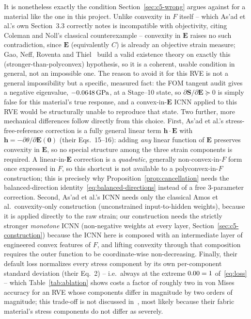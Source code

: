 \documentclass[10pt,a4paper]{article}
\begin{document}
It is nonetheless exactly the condition Section~\ref{sec:c5-wrong} argues
against for a material like the one in this project. Unlike convexity in
$F$ itself -- which As'ad et al.'s own Section~3.3 correctly notes is
incompatible with objectivity, citing Coleman and Noll's classical
counterexample -- convexity in $\bm E$ raises no such contradiction,
since $\bm E$ (equivalently $C$) is already an objective strain measure;
Gao, Neff, Roventa and Thiel~\cite{GaoNeffRoventaThiel2017} build a valid
existence theory on exactly this (stronger-than-polyconvex) hypothesis,
so it is a coherent, usable condition in general, not an impossible one.
The reason to avoid it for this RVE is not a general impossibility but a
specific, measured fact: the FOM tangent audit gives a negative
eigenvalue, $-0.0648\,\mathrm{GPa}$, at a Stage--10 state, so
$\partial\bm S/\partial\bm E\succeq0$ is simply false for this material's
true response, and a convex-in-$\bm E$ ICNN applied to this RVE would be
structurally unable to reproduce that state.  Two further, more mechanical
differences follow directly from this choice.  First, As'ad et al.'s
stress-free-reference correction is a fully general linear term $\bm
h\cdot\bm E$ with $\bm h=-\partial\theta/\partial\bm E(\bm 0)$ (their
Eqs.~15--16): adding \emph{any} linear function of $\bm E$ preserves
convexity in $\bm E$, so no special structure among the three strain
components is required.  A linear-in-$\bm E$ correction is a
\emph{quadratic}, generally non-convex-in-$F$ form once expressed in $F$,
so this shortcut is not available to a polyconvex-in-$F$ construction;
this is precisely why Proposition~\ref{prop:cancellation} needs the
balanced-direction identity~\eqref{eq:balanced-directions} instead of a
free 3-parameter correction.  Second, As'ad et al.'s ICNN needs only the
classical Amos et al.\ convexity-only construction (unconstrained
input-to-hidden weights), because it is applied directly to the raw
strain; our construction needs the strictly stronger \emph{monotone} ICNN
(non-negative weights at every layer, Section~\ref{sec:c5-construction})
because the ICNN here is composed with an intermediate layer of engineered
convex features of $F$, and lifting convexity through that composition
requires the outer function to be coordinate-wise non-decreasing.  Finally,
their default loss normalizes every stress component by its own
per-component standard deviation (their Eq.~2) -- i.e.\ always at the
extreme $0.00{}=1$ of~\eqref{eq:loss} -- which
Table~\ref{tab:ablation} shows costs a factor of roughly two in von Mises
accuracy for an RVE whose components differ in magnitude by two orders of
magnitude; this trade-off is not discussed in~\cite{Asad2022}, most likely
because their fabric material's stress components do not differ as
severely.
\end{document}
